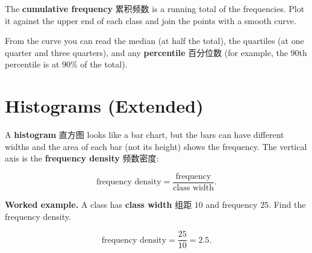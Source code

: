 \documentclass[11pt]{article}
\begin{document}
The \textbf{cumulative frequency} 累积频数 is a running total of the frequencies. Plot it against the upper end of each class and join the points with a smooth curve.

From the curve you can read the median (at half the total), the quartiles (at one quarter and three quarters), and any \textbf{percentile} 百分位数 (for example, the $90$th percentile is at $90\%$ of the total).

\section*{Histograms (Extended)}

A \textbf{histogram} 直方图 looks like a bar chart, but the bars can have different widths and the area of each bar (not its height) shows the frequency. The vertical axis is the \textbf{frequency density} 频数密度:

\[
\text{frequency density} = \frac{\text{frequency}}{\text{class width}}.
\]

\textbf{Worked example.} A class has \textbf{class width} 组距 $10$ and frequency $25$. Find the frequency density.

\[
\text{frequency density} = \frac{25}{10} = 2.5.
\]
\end{document}
